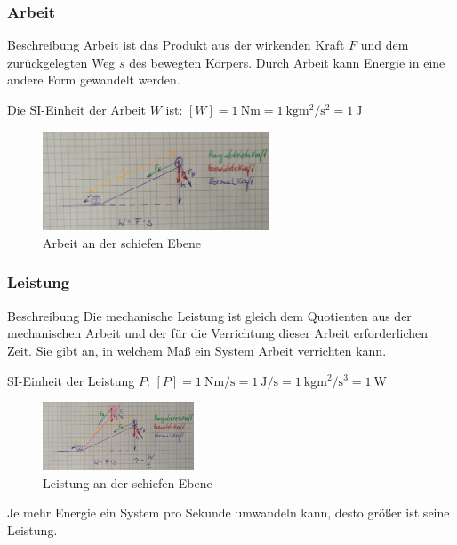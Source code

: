 \documentclass{article}
\begin{document}
\frame
{
  \frametitle{Arbeit}
\begin{block}{Beschreibung}
Arbeit ist das Produkt aus der wirkenden Kraft $F$ und dem zurückgelegten Weg $s$ des bewegten Körpers. Durch Arbeit kann Energie in eine andere Form gewandelt werden.
\end{block}
Die SI-Einheit der Arbeit $W$ ist:
$[W]=\SI{1}{\newton\meter}=\SI{1}{\kilo\gram\square\meter\per\square\second}=\SI{1}{\joule}$
      \begin{figure}
	  \includegraphics[width=0.6\textwidth]{Arbeit_1}
	  \vspace{-3mm}
	  \caption{Arbeit an der schiefen Ebene}
   \end{figure}
}

\frame
{
  \frametitle{Leistung}
\begin{block}{Beschreibung}
Die mechanische Leistung ist gleich dem Quotienten aus der mechanischen Arbeit und der für die Verrichtung dieser Arbeit erforderlichen Zeit. Sie gibt an, in welchem Maß ein System Arbeit verrichten kann.
\end{block}
SI-Einheit der Leistung $P$:
$[P]=\SI{1}{\newton\meter\per\second}=\SI{1}{\joule\per\second}=\SI{1}{\kilo\gram\square\meter\per\cubic\second}=\SI{1}{\watt}$
      \begin{figure}
	  \includegraphics[width=0.4\textwidth]{Leistung}
	  \vspace{-3mm}
	  \caption{Leistung an der schiefen Ebene}
   \end{figure}
   Je mehr Energie ein System pro Sekunde umwandeln kann, desto größer ist seine Leistung.
}
\end{document}

